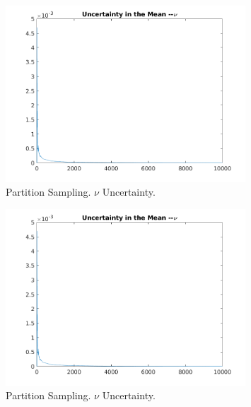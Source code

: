 \documentclass{article}
\begin{document}
\begin{enumerate}
\begin{enumerate}
        
        \begin{figure}
          \centering
          \includegraphics[width=0.8\textwidth]{partition_nu_uncertainty}
          \caption{Partition Sampling. $\nu$ Uncertainty.}
          \label{fig:partition_nu_uncertainty}
        \end{figure}

        \begin{figure}
          \centering
          \includegraphics[width=0.8\textwidth]{partition_nu_uncertainty}
          \caption{Partition Sampling. $\nu$ Uncertainty.}
          \label{fig:partition_nu_uncertainty}
        \end{figure}
    \end{enumerate}
\end{enumerate}
\end{document}
